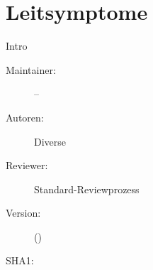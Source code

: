 \def\ChapterCode{SYM}
\chapter
[\CO{[SYM]} Leitsymptome]
{Leitsymptome}

\ChapterIntro
{%
Intro 

}
{%
\begin{description}
  \item[Maintainer:] --
  \item[Autoren:] Diverse
  \item[Reviewer:] Standard-Reviewprozess
  \item[Version:] {\DocVersion} ({\DocVersionInfo})
  \item[SHA1:] {\DocGitCommit}
\end{description}

{\TxTeilkapitelAASS}
}

\SectionUnderDevelopment{}










